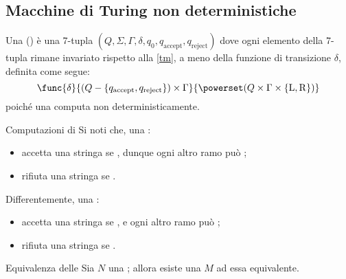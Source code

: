 \documentclass[a4paper, 12pt]{report}
\begin{document}
    \subsection{Macchine di Turing non deterministiche}

    \begin{frameddefn}{\NTM}
        Una \tbf{\NTM} () è una 7-tupla $(Q, \Sigma, \Gamma, \delta, q_0, q_\mathrm{accept}, q_\mathrm{reject})$ dove ogni elemento della 7-tupla rimane invariato rispetto alla \cref{tm}, a meno della funzione di transizione $\delta$, definita come segue: $$\func{\delta}{(Q-\{q_\mathrm{accept}, q_\mathrm{reject}\}) \times \Gamma}{\powerset(Q \times \Gamma \times \{ \mathrm L, \mathrm R\})}$$ poiché una \NTM computa non deterministicamente.
    \end{frameddefn}

    \begin{framedobs}{Computazioni di \NTM}
        Si noti che, una \NTM {}:
        
        \begin{itemize}
            \item accetta una stringa se , dunque ogni altro ramo può ;
            \item rifiuta una stringa se .
        \end{itemize}

        Differentemente, una \NTM {}:

        \begin{itemize}
            \item accetta una stringa se , e ogni altro ramo può ;
            \item rifiuta una stringa se .
        \end{itemize}
    \end{framedobs}

    \begin{framedprop}[label={ntm tm}]{Equivalenza delle \NTM}
        Sia $N$ una \NTM; allora esiste una \TM $M$ ad essa equivalente.
    \end{framedprop}
\end{document}
